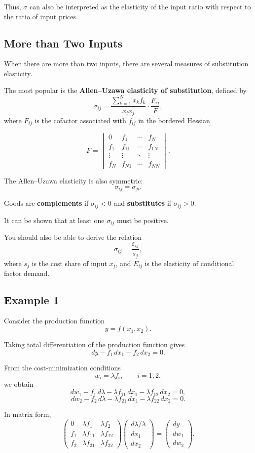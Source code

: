 Thus, $\sigma$ can also be interpreted as the elasticity of the input ratio
with respect to the ratio of input prices.

\subsection*{More than Two Inputs}

When there are more than two inputs, there are several measures of
substitution elasticity.

The most popular is the \textbf{Allen--Uzawa elasticity of substitution},
defined by
\[
\sigma_{ij}
=
\frac{\sum_{k=1}^N x_k f_k}{x_i x_j}\cdot \frac{F_{ij}}{F},
\]
where $F_{ij}$ is the cofactor associated with $f_{ij}$ in the bordered Hessian

\[
F =
\begin{vmatrix}
0 & f_1 & \cdots & f_N \\
f_1 & f_{11} & \cdots & f_{1N} \\
\vdots & \vdots & \ddots & \vdots \\
f_N & f_{N1} & \cdots & f_{NN}
\end{vmatrix}.
\]

The Allen--Uzawa elasticity is also symmetric:
\[
\sigma_{ij} = \sigma_{ji}.
\]

Goods are \textbf{complements} if $\sigma_{ij}<0$ and
\textbf{substitutes} if $\sigma_{ij}>0$.

It can be shown that at least one $\sigma_{ij}$ must be positive.

You should also be able to derive the relation
\[
\sigma_{ij} = \frac{\varepsilon_{ij}}{s_j},
\]
where $s_j$ is the cost share of input $x_j$, and $E_{ij}$ is the elasticity
of conditional factor demand.
\subsection*{Example 1}

Consider the production function
\[
y = f(x_1,x_2).
\]

Taking total differentiation of the production function gives
\[
dy - f_1\,dx_1 - f_2\,dx_2 = 0.
\]

From the cost-minimization conditions
\[
w_i=\lambda f_i,\qquad i=1,2,
\]
we obtain
\[
dw_1-f_1\,d\lambda-\lambda f_{11}\,dx_1-\lambda f_{12}\,dx_2=0,
\]
\[
dw_2-f_2\,d\lambda-\lambda f_{21}\,dx_1-\lambda f_{22}\,dx_2=0.
\]

In matrix form,
\[
\begin{pmatrix}
0 & \lambda f_1 & \lambda f_2 \\
f_1 & \lambda f_{11} & \lambda f_{12} \\
f_2 & \lambda f_{21} & \lambda f_{22}
\end{pmatrix}
\begin{pmatrix}
d\lambda/\lambda \\
dx_1 \\
dx_2
\end{pmatrix}
=
\begin{pmatrix}
dy \\
dw_1 \\
dw_2
\end{pmatrix}.
\]

